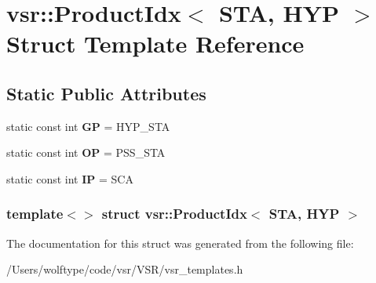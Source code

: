 \hypertarget{structvsr_1_1_product_idx_3_01_s_t_a_00_01_h_y_p_01_4}{\section{vsr\-:\-:Product\-Idx$<$ S\-T\-A, H\-Y\-P $>$ Struct Template Reference}
\label{structvsr_1_1_product_idx_3_01_s_t_a_00_01_h_y_p_01_4}
}
\subsection*{Static Public Attributes}
\begin{DoxyCompactItemize}
\item 
\hypertarget{structvsr_1_1_product_idx_3_01_s_t_a_00_01_h_y_p_01_4_a26d61b81aabb627040e994317ebfbc84}{static const int {\bfseries G\-P} = H\-Y\-P\-\_\-\-S\-T\-A}\label{structvsr_1_1_product_idx_3_01_s_t_a_00_01_h_y_p_01_4_a26d61b81aabb627040e994317ebfbc84}

\item 
\hypertarget{structvsr_1_1_product_idx_3_01_s_t_a_00_01_h_y_p_01_4_ac3ec5d359bc5eaceb06f44b8bd1c8b68}{static const int {\bfseries O\-P} = P\-S\-S\-\_\-\-S\-T\-A}\label{structvsr_1_1_product_idx_3_01_s_t_a_00_01_h_y_p_01_4_ac3ec5d359bc5eaceb06f44b8bd1c8b68}

\item 
\hypertarget{structvsr_1_1_product_idx_3_01_s_t_a_00_01_h_y_p_01_4_a2f3b550842928cfc0b14844f918d5a2a}{static const int {\bfseries I\-P} = S\-C\-A}\label{structvsr_1_1_product_idx_3_01_s_t_a_00_01_h_y_p_01_4_a2f3b550842928cfc0b14844f918d5a2a}

\end{DoxyCompactItemize}
\subsubsection*{template$<$$>$ struct vsr\-::\-Product\-Idx$<$ S\-T\-A, H\-Y\-P $>$}



The documentation for this struct was generated from the following file\-:\begin{DoxyCompactItemize}
\item 
/\-Users/wolftype/code/vsr/\-V\-S\-R/vsr\-\_\-templates.\-h\end{DoxyCompactItemize}
